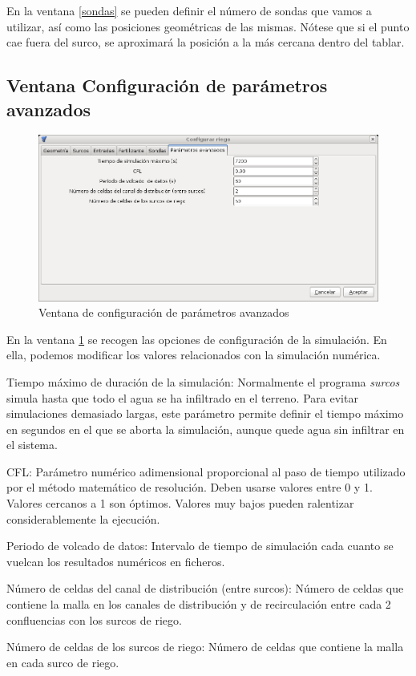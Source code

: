 En la ventana \ref{sondas} se pueden definir el número de sondas que vamos a utilizar, así como las posiciones geométricas de las mismas. Nótese que si el punto cae fuera del surco, se aproximará la posición a la más cercana dentro del tablar. 

\subsection{Ventana Configuración de parámetros avanzados}

\begin{figure}[!h]
\begin{center}
\includegraphics*[width=\textwidth]{images/confParam.png}
\qquad
\caption{Ventana de configuración de parámetros avanzados}\label{param}
\end{center}
\end{figure}

En la ventana \ref{param} se recogen las opciones de configuración de la simulación. En ella, podemos modificar los valores relacionados con la simulación numérica.

\begin{description}
\item{Tiempo máximo de duración de la simulación}: Normalmente el programa \emph{surcos} simula hasta que todo el agua se ha infiltrado en el terreno. Para evitar simulaciones demasiado largas, este parámetro permite definir el tiempo máximo en segundos en el que se aborta la simulación, aunque quede agua sin infiltrar en el sistema.
\item{CFL}: Parámetro numérico adimensional proporcional al paso de tiempo utilizado por el método matemático de resolución. Deben usarse valores entre 0 y 1. Valores cercanos a 1 son óptimos. Valores muy bajos pueden ralentizar considerablemente la ejecución.
\item{Periodo de volcado de datos}: Intervalo de tiempo de simulación cada cuanto se vuelcan los resultados numéricos en ficheros.
\item{Número de celdas del canal de distribución (entre surcos)}: Número de celdas que contiene la malla en los canales de distribución y de recirculación entre cada 2 confluencias con los surcos de riego.
\item{Número de celdas de los surcos de riego}: Número de celdas que contiene la malla en cada surco de riego.
\end{description}

